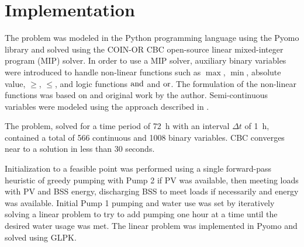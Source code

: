 \section{Implementation}

The problem was modeled in the Python programming language using the Pyomo library\cite{hart2011pyomo,bynum2021pyomo} and solved using the COIN-OR CBC\cite{CBC} open-source linear mixed-integer program (MIP) solver. In order to use a MIP solver, auxiliary binary variables were introduced to handle non-linear functions such as $\max$, $\min$, absolute value, $\ge$, $\le$, and logic functions $\operatorname{and}$ and $\operatorname{or}$. The formulation of the non-linear functions was based on \cite{YALPMIP_logic} and original work by the author. Semi-continuous variables were modeled using the approach described in \cite{MILP_handout}.

The problem, solved for a time period of \SI{72}{h} with an interval $\Delta t$ of \SI{1}{h}, contained a total of 566 continuous and 1008 binary variables. CBC converges near to a solution in less than 30 seconds.

Initialization to a feasible point was performed using a single forward-pass heuristic of greedy pumping with Pump 2 if PV was available, then meeting loads with PV and BSS energy, discharging BSS to meet loads if necessarily and energy was available. Initial Pump 1 pumping and water use was set by iteratively solving a linear problem to try to add pumping one hour at a time until the desired water usage was met. The linear problem was implemented in Pyomo and solved using GLPK\cite{GLPK}.